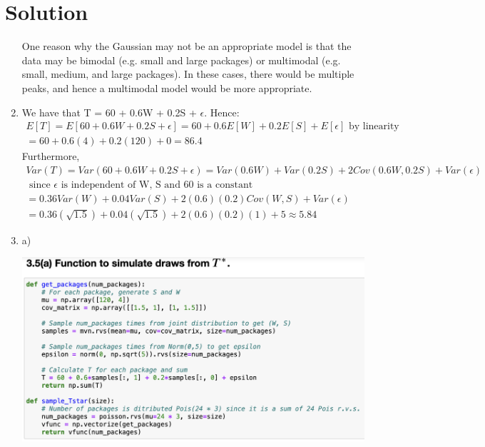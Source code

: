 \documentclass{harvardml}
\theoremstyle{definition}
\theoremstyle{plain}
\newenvironment{solution}
  {\color{blue}\section*{Solution}}
{}
\begin{document}
\begin{solution}
\begin{enumerate}
    One reason why the Gaussian may not be an appropriate model is that the data may be bimodal (e.g. small and large packages) or multimodal (e.g. small, medium, and large packages). In these cases, there would be multiple peaks, and hence a multimodal model would be more appropriate. 
    \item We have that T = 60 + 0.6W + 0.2S + $\epsilon$. Hence: 
    \begin{equation*}
        \begin{split}
            E[T] = E[60 + 0.6W + 0.2S + \epsilon] = 60 + 0.6E[W] + 0.2E[S] + E[\epsilon] \text{ by linearity} \\
            = 60 + 0.6(4) + 0.2(120) + 0 = \boxed{86.4}
        \end{split}
    \end{equation*}
    Furthermore, 
    \begin{equation*}
        \begin{split}
            Var(T) = Var(60 + 0.6W + 0.2S + \epsilon) = Var(0.6W) + Var(0.2S) + 2Cov(0.6W, 0.2S) + Var(\epsilon) \\ \text{ since } \epsilon \text{ is independent of W, S and 60 is a constant} 
            \\ = 0.36Var(W) + 0.04Var(S) + 2(0.6)(0.2)Cov(W,S) + Var(\epsilon) 
            \\ = 0.36(\sqrt{1.5}) + 0.04(\sqrt{1.5}) + 2(0.6)(0.2)(1) + 5 \approx \boxed{5.84}
        \end{split}
    \end{equation*}
    \item 
    a) \begin{center}
        \includegraphics[scale=0.45]{3.5.png}
    \end{center}


\end{enumerate}
\end{solution}
\end{document}
